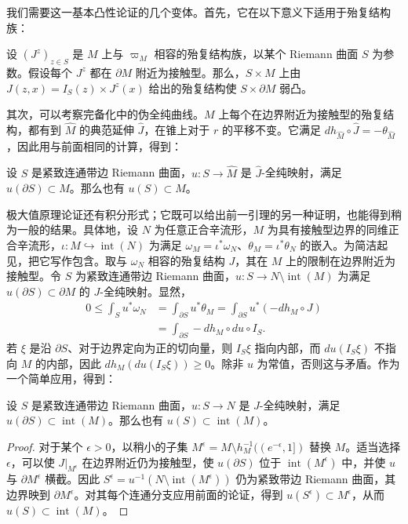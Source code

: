 我们需要这一基本凸性论证的几个变体。首先，它在以下意义下适用于殆复结构族：
\begin{lemma}\label{st:7.3}
设 $(J^z)_{z\in S}$ 是 $M$ 上与 $\varpi_M$ 相容的殆复结构族，以某个 Riemann 曲面 $S$ 为参数。假设每个 $J^z$ 都在 $\partial M$ 附近为接触型。那么，$S\times M$ 上由 $J(z,x)=I_S(z)\times J^z(x)$ 给出的殆复结构使 $S\times\partial M$ 弱凸。
\end{lemma}
其次，可以考察完备化中的伪全纯曲线。$M$ 上每个在边界附近为接触型的殆复结构，都有到 $\widehat M$ 的典范延伸 $\hat J$，在锥上对于 $r$ 的平移不变。它满足 $dh_{\widehat M}\circ\hat J=-\theta_{\widehat M}$，因此用与前面相同的计算，得到：
\begin{lemma}\label{st:7.4}
设 $S$ 是紧致连通带边 Riemann 曲面，$u:S\to\widehat M$ 是 $\hat J$-全纯映射，满足 $u(\partial S)\subset M$。那么也有 $u(S)\subset M$。
\end{lemma}
极大值原理论证还有积分形式；它既可以给出前一引理的另一种证明，也能得到稍为一般的结果。具体地，设 $N$ 为任意正合辛流形，$M$ 为具有接触型边界的同维正合辛流形，$\iota:M\hookrightarrow\operatorname{int}(N)$ 为满足 $\omega_M=\iota^*\omega_N$、$\theta_M=\iota^*\theta_N$ 的嵌入。为简洁起见，把它写作包含。取与 $\omega_N$ 相容的殆复结构 $J$，其在 $M$ 上的限制在边界附近为接触型。令 $S$ 为紧致连通带边 Riemann 曲面，$u:S\to N\setminus\operatorname{int}(M)$ 为满足 $u(\partial S)\subset\partial M$ 的 $J$-全纯映射。显然，
\begin{equation}\label{eq:7.5}
\begin{aligned}
0\leq\int_Su^*\omega_N&=\int_{\partial S}u^*\theta_M=\int_{\partial S}u^*(-dh_M\circ J)\\
&=\int_{\partial S}-dh_M\circ du\circ I_S.
\end{aligned}
\end{equation}
若 $\xi$ 是沿 $\partial S$、对于边界定向为正的切向量，则 $I_S\xi$ 指向内部，而 $du(I_S\xi)$ 不指向 $M$ 的内部，因此 $dh_M(du(I_S\xi))\geq0$。除非 $u$ 为常值，否则这与矛盾。作为一个简单应用，得到：
\begin{lemma}\label{st:7.5}
设 $S$ 是紧致连通带边 Riemann 曲面，$u:S\to N$ 是 $J$-全纯映射，满足 $u(\partial S)\subset\operatorname{int}(M)$。那么也有 $u(S)\subset\operatorname{int}(M)$。
\end{lemma}
\begin{proof}
对于某个 $\epsilon>0$，以稍小的子集 $M^{\epsilon}=M\setminus h_M^{-1}((e^{-\epsilon},1])$ 替换 $M$。适当选择 $\epsilon$，可以使 $J|_{M^{\epsilon}}$ 在边界附近仍为接触型，使 $u(\partial S)$ 位于 $\operatorname{int}(M^{\epsilon})$ 中，并使 $u$ 与 $\partial M^{\epsilon}$ 横截。因此 $S^{\epsilon}=u^{-1}(N\setminus\operatorname{int}(M^{\epsilon}))$ 仍为紧致带边 Riemann 曲面，其边界映到 $\partial M^{\epsilon}$。对其每个连通分支应用前面的论证，得到 $u(S^{\epsilon})\subset M^{\epsilon}$，从而 $u(S)\subset\operatorname{int}(M)$。
\end{proof}
